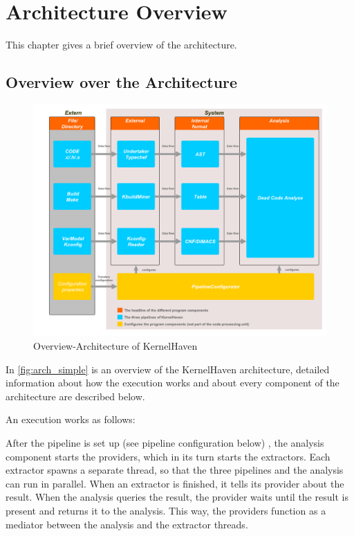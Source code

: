 
\chapter{Architecture Overview}
This chapter gives a brief overview of the architecture.

\section{Overview over the Architecture}

\begin{figure}[htbp] 
  \centering
  \begin{minipage}[b]{1\textwidth} 
    \caption{Overview-Architecture of KernelHaven}\label{fig:arch_simple}
    \includegraphics[width=1\textwidth]{Bilder/arch_simple.pdf}
  \end{minipage}
\end{figure}

\smallskip
In \autoref{fig:arch_simple} is an overview of the KernelHaven architecture, detailed information about how the execution works and about every component of the architecture are described below.

An execution works as follows:

After the pipeline is set up (see pipeline configuration below) , the analysis component starts the providers, which in its turn starts the extractors. Each extractor spawns a separate thread, so that the three pipelines and the analysis can run in parallel. When an extractor is finished, it tells its provider about the result. When the analysis queries the result, the provider waits until the result is present and returns it to the analysis. This way, the providers function as a mediator between the analysis and the extractor threads.

